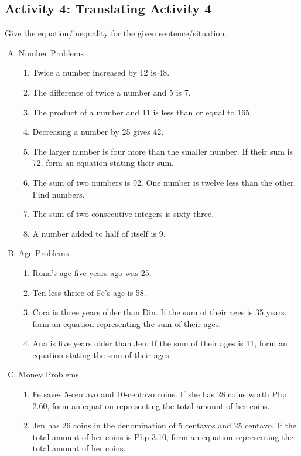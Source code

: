 \subsection*{Activity 4: Translating Activity 4}
Give the equation/inequality for the given sentence/situation.
\begin{enumerate}[A.]
\item Number Problems
	\begin{enumerate}
	\item Twice a number increased by 12 is 48.
	\item The difference of twice a number and 5 is 7.
	\item The product of a number and 11 is less than or equal to 165.
	\item Decreasing a number by 25 gives 42.
	\item The larger number is four more than the smaller number. If their sum is 72, form an equation stating their sum.
	\item The sum of two numbers is 92. One number is twelve less than the other. Find numbers. 
	\item The sum of two consecutive integers is sixty-three.
	\item A number added to half of itself is 9. 
	\end{enumerate}
\item Age Problems 
	\begin{enumerate}
	\item Rona's age five years ago was 25. 
	\item Ten less thrice of Fe's age is 58. 
	\item Cora is three years older than Din. If the sum of 
    their ages is 35 years, form an equation representing 
    the sum of their ages. 
	\item Ana is five years older than Jen. If the sum of their 
    ages is 11, form an equation stating the sum of their 
    ages.
	\end{enumerate}
\item Money Problems
	\begin{enumerate}
	\item Fe saves 5-centavo and 10-centavo coins. If she has 28 coins worth Php 2.60, form an equation
representing the total amount of her coins.
	\item Jen has 26 coins in the denomination of 5 centavos and 25 centavo. If the total amount of her coins is Php 3.10, form an equation representing the total amount of her coins.
	\end{enumerate}

\end{enumerate}

